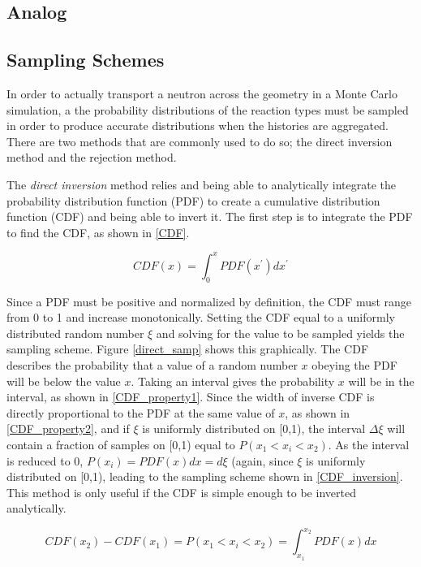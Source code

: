 \subsection{Analog }


\subsection{Sampling Schemes}

In order to actually transport a neutron across the geometry in a Monte Carlo simulation, a the probability distributions of the reaction types must be sampled in order to produce accurate distributions when the histories are aggregated.  There are two methods that are commonly used to do so; the direct inversion method and the rejection method.  

The \emph{direct inversion} method relies and being able to analytically integrate the probability distribution function (PDF) to create a cumulative distribution function (CDF) and being able to invert it.  The first step is to integrate the PDF to find the CDF, as shown in \eqref{CDF}.

\begin{equation}
\label{CDF}
CDF(x) = \int_0^x PDF(x^\prime) dx^\prime
\end{equation}

Since a PDF must be positive and normalized by definition, the CDF must range from 0 to 1 and increase monotonically.  Setting the CDF equal to a uniformly distributed random number $\xi$ and solving for the value to be sampled yields the sampling scheme.  Figure \ref{direct_samp} shows this graphically.  The CDF describes the probability that a value of a random number $x$ obeying the PDF will be below the value $x$.  Taking an interval gives the probability $x$ will be in the interval, as shown in \eqref{CDF_property1}.  Since the width of inverse CDF is directly proportional to the PDF at the same value of $x$, as shown in \eqref{CDF_property2}, and if $\xi$ is uniformly distributed on [0,1), the interval $\Delta \xi$ will contain a fraction of samples on [0,1) equal to $P( x_1 < x_i < x_2)$.  As the interval is reduced to 0, $P(x_i)= PDF(x)dx = d\xi$ (again, since $\xi$ is uniformly distributed on [0,1), leading to the sampling scheme shown in \eqref{CDF_inversion}.  This method is only useful if the CDF is simple enough to be inverted analytically.

\begin{equation}
\label{CDF_property1}
CDF(x_2) - CDF(x_1) = P( x_1 < x_i < x_2) = \int_{x_1}^{x_2} PDF(x) dx
\end{equation}

